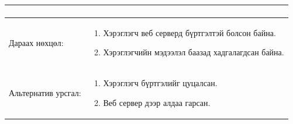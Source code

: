 \begin{center}
\begin{table}[!htbp]
\begin{tabular}{|p{4cm}|p{11cm}|}
\begin{enumerate}
\begin{enumerate}
							 	\end{enumerate}
						  \end{enumerate}
\\					  \hline
				Дараах нөхцөл: &
				 \begin{enumerate}
									\item Хэрэглэгч веб серверд бүртгэлтэй болсон байна. 
									\item Хэрэглэгчийн мэдээлэл баазад хадгалагдсан байна. 
				\end{enumerate}	   
\\				   \hline
				Альтернатив урсгал: &  \begin{enumerate}
									\item Хэрэглэгч бүртгэлийг цуцалсан.
									\item Веб сервер дээр алдаа гарсан. 
										\end{enumerate}
				\\	\hline
		\end{tabular}
	\end{table}
\end{center}


